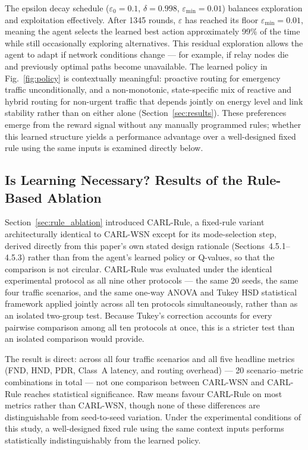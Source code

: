 \documentclass[12pt]{article}
\begin{document}
The epsilon decay schedule ($\varepsilon_0 = 0.1$,
$\delta = 0.998$, $\varepsilon_{\min} = 0.01$) balances
exploration and exploitation effectively. After 1345 rounds, $\varepsilon$ has reached
its floor $\varepsilon_{\min} = 0.01$, meaning the agent selects the learned
best action approximately 99\% of the time while still occasionally exploring
alternatives. This residual
exploration allows the agent to adapt if network conditions change
--- for example, if relay nodes die and previously optimal paths become
unavailable. The learned policy in Fig.~\ref{fig:policy} is
contextually meaningful: proactive routing for emergency traffic
unconditionally, and a non-monotonic, state-specific mix of
reactive and hybrid routing for non-urgent traffic that depends
jointly on energy level and link stability rather than on either
alone (Section~\ref{sec:results}). These preferences emerge from the
reward signal without any manually programmed rules; whether this
learned structure yields a performance advantage over a
well-designed fixed rule using the same inputs is examined directly
below.

\subsection{Is Learning Necessary? Results of the Rule-Based Ablation}
\label{sec:rule_ablation_results}

Section~\ref{sec:rule_ablation} introduced CARL-Rule, a fixed-rule
variant architecturally identical to CARL-WSN except for its
mode-selection step, derived directly from this paper's own stated
design rationale (Sections~4.5.1--4.5.3) rather than from the
agent's learned policy or Q-values, so that the comparison is not
circular. CARL-Rule was evaluated under the identical experimental
protocol as all nine other protocols --- the same 20 seeds, the same
four traffic scenarios, and the same one-way ANOVA and Tukey HSD
statistical framework applied jointly across all ten protocols
simultaneously, rather than as an isolated two-group test. Because
Tukey's correction accounts for every pairwise comparison among all
ten protocols at once, this is a stricter test than an isolated
comparison would provide.

The result is direct: across all four traffic scenarios and all five
headline metrics (FND, HND, PDR, Class~A latency, and routing
overhead) --- 20 scenario--metric combinations in total --- not one
comparison between CARL-WSN and CARL-Rule reaches statistical
significance. Raw means favour CARL-Rule on most metrics rather than
CARL-WSN, though none of these differences are distinguishable from
seed-to-seed variation. Under the experimental conditions of this
study, a well-designed fixed rule using the same context inputs
performs statistically indistinguishably from the learned policy.
\end{document}
